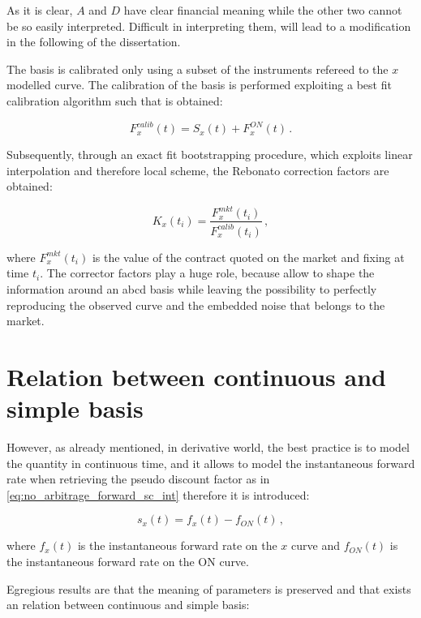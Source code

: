 As it is clear, $A$ and $D$ have clear financial meaning while the other two cannot be so easily interpreted. Difficult in interpreting them, will lead to a modification in the following of the dissertation.

The basis is calibrated only using a subset of the instruments refereed to the $x$ modelled curve. The calibration of the basis is performed exploiting a best fit calibration algorithm such that is obtained:

\begin{equation}
F_x^{calib}(t) = S_x(t) + F_x^{ON}(t)\,.
\end{equation}

Subsequently, through an exact fit bootstrapping procedure, which exploits linear interpolation and therefore local scheme, the Rebonato correction factors are obtained:

\begin{equation}
K_x(t_i) = \frac{F_x^{mkt}(t_i)}{F_x^{calib}(t_i)}\,,
\label{direct-k}
\end{equation}

where $F_x^{mkt}(t_i)$ is the value of the contract quoted on the market and fixing at time $t_i$.
The corrector factors play a huge role, because allow to shape the information around an abcd basis while leaving the possibility to perfectly reproducing the observed curve and the embedded noise that belongs to the market.

\section{Relation between continuous and simple basis }

However, as already mentioned, in derivative world, the best practice is to model the quantity in continuous time, and it allows to model the instantaneous forward rate when retrieving the pseudo discount factor as in \eqref{eq:no_arbitrage_forward_sc_int} therefore it is introduced:

\begin{equation}
s_x(t) = f_x(t) - f_{ON}(t)\,,
\label{eq:s_x}
\end{equation}

where $f_x(t)$ is the instantaneous forward rate on the $x$ curve and $f_{ON}(t)$ is the instantaneous forward rate on the ON curve.

Egregious results are that the meaning of parameters is preserved and that exists an relation between continuous and simple basis:

